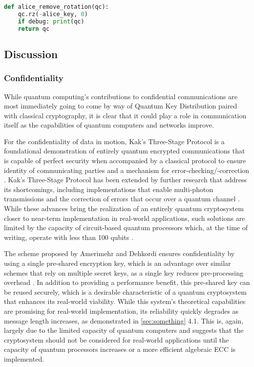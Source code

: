 \documentclass[sigconf]{acmart}
\begin{document}
\begin{lstlisting}[caption={Implementation, Step 5 (Partial)},label={lst:kak_s5},language=Python]
def alice_remove_rotation(qc):
    qc.rz(-alice_key, 0)
    if debug: print(qc)
    return qc
\end{lstlisting}

\subsection{Discussion}
\subsubsection{Confidentiality}
While quantum computing’s contributions to confidential communications are most immediately going to come by way of Quantum Key Distribution paired with classical cryptography, it is clear that it could play a role in communication itself as the capabilities of quantum computers and networks improve.

For the confidentiality of data in motion, Kak’s Three-Stage Protocol is a foundational demonstration of entirely quantum encrypted communications that is capable of perfect security when accompanied by a classical protocol to ensure identity of communicating parties and a mechanism for error-checking/-correction \cite{kak_three-stage_2006}. %
Kak’s Three-Stage Protocol has been extended by further research that address its shortcomings, including implementations that enable multi-photon transmissions \cite{mandal_multi-photon_2013} and the correction of errors that occur over a quantum channel \cite{parakh_correcting_2016}. While these advances bring the realization of an entirely quantum cryptosystem closer to near-term implementation in real-world applications, such solutions are limited by the capacity of circuit-based quantum processors which, at the time of writing, operate with less than 100 qubits \cite{noauthor_ibms_2020, arute_quantum_2019}. %

The scheme proposed by Amerimehr and Dehkordi ensures confidentiality by using a single pre-shared encryption key, which is an advantage over similar schemes that rely on multiple secret keys, as a single key reduces pre-processing overhead \cite{amerimehr_quantum_2018}. In addition to providing a performance benefit, this pre-shared key can be reused securely, which is a desirable characteristic of a quantum cryptosystem that enhances its real-world viability. While this system’s theoretical capabilities are promising for real-world implementation, its reliability quickly degrades as message length increases, as demonstrated in \ref{sec:something} 4.1. %
This is, again, largely due to the limited capacity of quantum computers and suggests that the cryptosystem should not be considered for real-world applications until the capacity of quantum processors increases or a more efficient algebraic ECC is implemented.
\end{document}
